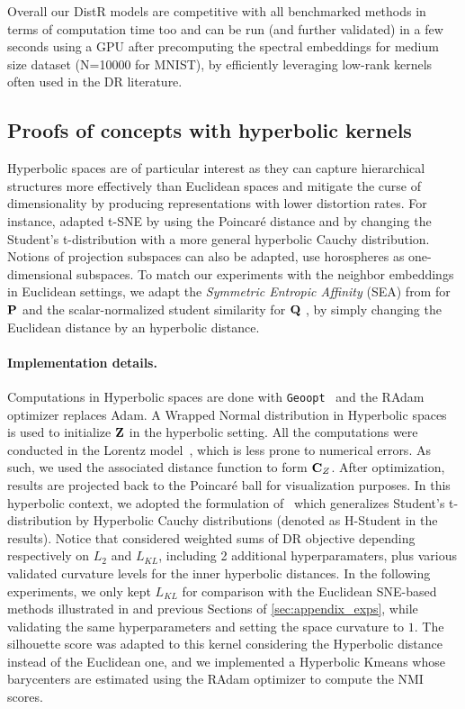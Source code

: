 Overall our DistR models are competitive with all benchmarked methods in terms of computation time too and can be run (and further validated) in a few seconds using a GPU after precomputing the spectral embeddings for medium size dataset (N=10000 for MNIST), by efficiently leveraging low-rank kernels often used in the DR literature.



\subsection{Proofs of concepts with hyperbolic kernels}\label{sec:hyperbolic}

Hyperbolic spaces \citep{Chami21, Fan_2022_CVPR, Guo22, Lin23} are of particular interest as they can capture hierarchical structures more effectively than Euclidean spaces and mitigate the curse of dimensionality by producing representations with lower distortion rates. For instance, \citep{Guo22} adapted t-SNE by using the Poincaré distance and by changing the Student's t-distribution with a more general hyperbolic Cauchy distribution.  Notions of projection subspaces can also be adapted, \eg \citep{Chami21} use horospheres as one-dimensional subspaces. To match our experiments with the neighbor embeddings in Euclidean settings, we adapt the \emph{Symmetric Entropic Affinity} (SEA) from  for ${\mathbf{P}}$ and the scalar-normalized student similarity for ${\mathbf{Q}}$ \citep{van2008visualizing}, by simply changing the Euclidean distance by an hyperbolic distance.


\paragraph{Implementation details.} Computations in Hyperbolic spaces are done with \texttt{Geoopt}~\citep{geoopt2020kochurov} and the RAdam optimizer \citep{becigneul2018riemannian} replaces Adam. A Wrapped Normal distribution in Hyperbolic spaces~\citep{Nagano19} is used to initialize ${\mathbf{Z}}$ in the hyperbolic setting.
All the computations were conducted in the Lorentz model~\citep{Nickel18}, which is less prone to numerical errors. As such, we used the associated distance function to form ${\mathbf{C}}_Z$. After optimization, results are projected back to the Poincaré ball for visualization purposes. In this hyperbolic context, we adopted the formulation of~\citep{Guo22} which generalizes Student's t-distribution by Hyperbolic Cauchy distributions (denoted as H-Student in the results). Notice that \citep{Guo22} considered weighted sums of DR objective depending respectively on $L_2$ and $L_{KL}$, including 2 additional hyperparamaters, plus various validated curvature levels for the inner hyperbolic distances. In the following experiments, we only kept $L_{KL}$ for comparison with the Euclidean SNE-based methods illustrated in  and previous Sections of \ref{sec:appendix_exps}, while validating the same hyperparameters and setting the space curvature to $1$. The silhouette score was adapted to this kernel considering the Hyperbolic distance instead of the Euclidean one, and we implemented a Hyperbolic Kmeans whose barycenters are estimated using the RAdam optimizer to compute the NMI scores.


